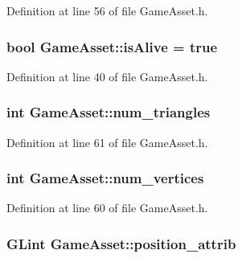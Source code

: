 Definition at line 56 of file Game\-Asset.\-h.

\hypertarget{classGameAsset_aebf93ae52dc7fabbb6ec7edaadf915d0}{
\subsubsection[{is\-Alive}]{\setlength{\rightskip}{0pt plus 5cm}bool Game\-Asset\-::is\-Alive = true}}\label{classGameAsset_aebf93ae52dc7fabbb6ec7edaadf915d0}


Definition at line 40 of file Game\-Asset.\-h.

\hypertarget{classGameAsset_aae4d864335c2eca685cc86602881cd18}{
\subsubsection[{num\-\_\-triangles}]{\setlength{\rightskip}{0pt plus 5cm}int Game\-Asset\-::num\-\_\-triangles\hspace{0.3cm}{\ttfamily [protected]}}}\label{classGameAsset_aae4d864335c2eca685cc86602881cd18}


Definition at line 61 of file Game\-Asset.\-h.

\hypertarget{classGameAsset_a3e8d7dc58d3d4efafbbce1536b78dbc7}{
\subsubsection[{num\-\_\-vertices}]{\setlength{\rightskip}{0pt plus 5cm}int Game\-Asset\-::num\-\_\-vertices\hspace{0.3cm}{\ttfamily [protected]}}}\label{classGameAsset_a3e8d7dc58d3d4efafbbce1536b78dbc7}


Definition at line 60 of file Game\-Asset.\-h.

\hypertarget{classGameAsset_ad8c8198dcc470301e8f5eae8dc8506bb}{
\subsubsection[{position\-\_\-attrib}]{\setlength{\rightskip}{0pt plus 5cm}G\-Lint Game\-Asset\-::position\-\_\-attrib\hspace{0.3cm}{\ttfamily [protected]}}}\label{classGameAsset_ad8c8198dcc470301e8f5eae8dc8506bb}



